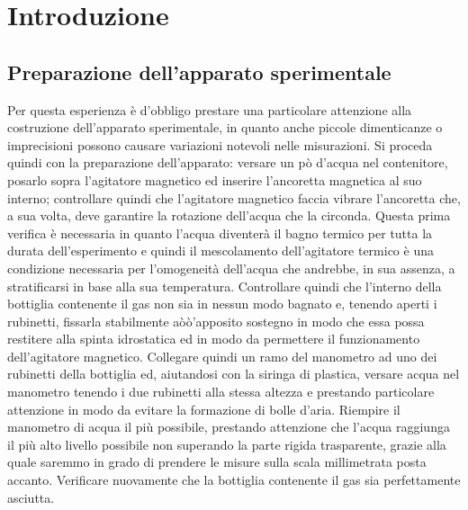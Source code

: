 \section{Introduzione}
\subsection{Preparazione dell'apparato sperimentale}

Per questa esperienza è d'obbligo prestare una particolare attenzione alla costruzione dell'apparato sperimentale, in quanto anche piccole dimenticanze o imprecisioni possono causare variazioni notevoli nelle misurazioni.
Si proceda quindi con la preparazione dell'apparato: versare un pò d'acqua nel contenitore, posarlo sopra l'agitatore magnetico ed inserire l'ancoretta magnetica al suo interno; controllare quindi che l'agitatore magnetico faccia vibrare l'ancoretta che, a sua volta, deve garantire la rotazione dell'acqua che la circonda.
Questa prima verifica è necessaria in quanto l'acqua diventerà il bagno termico per tutta la durata dell'esperimento e quindi il mescolamento dell'agitatore termico è una condizione necessaria per l'omogeneità dell'acqua che andrebbe, in sua assenza, a stratificarsi in base alla sua temperatura.
Controllare quindi che l'interno della bottiglia contenente il gas non sia in nessun modo bagnato e, tenendo aperti i rubinetti, fissarla stabilmente aòò'apposito sostegno in modo che essa possa restitere alla spinta idrostatica ed in modo da permettere il funzionamento dell'agitatore magnetico.
Collegare quindi un ramo del manometro ad uno dei rubinetti della bottiglia ed, aiutandosi con la siringa di plastica, versare acqua nel manometro tenendo i due rubinetti alla stessa altezza e prestando particolare attenzione in modo da evitare la formazione di bolle d'aria.
Riempire il manometro di acqua il più possibile, prestando attenzione che l'acqua raggiunga il più alto livello possibile non superando la parte rigida trasparente, grazie alla quale saremmo in grado di prendere le misure sulla scala millimetrata posta accanto.
Verificare nuovamente che la bottiglia contenente il gas sia perfettamente asciutta.

